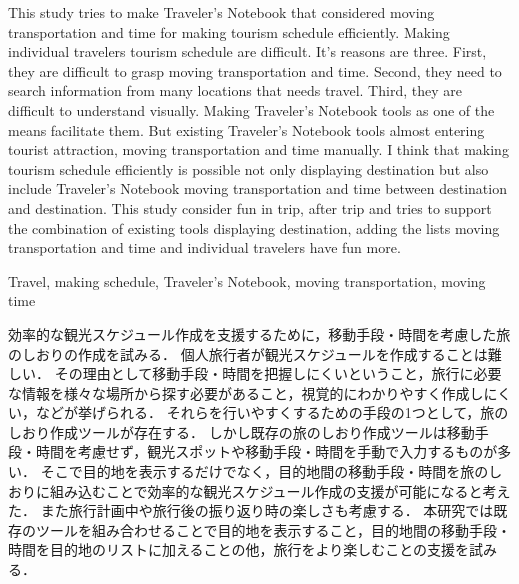 \documentclass{funthesis}
\begin{document}
\maketitle       %

\begin{eabstract}
This study tries to make Traveler's Notebook that considered moving transportation and time for making tourism schedule efficiently.
Making individual travelers tourism schedule are difficult.
It's reasons are three. First, they are difficult to grasp moving transportation and time. Second, they need to search information from many locations that needs travel. Third,  they are difficult to understand visually.
Making Traveler's Notebook tools as one of the means facilitate them.
But existing Traveler's Notebook tools almost entering tourist attraction, moving transportation and time manually.
I think that making tourism schedule efficiently is possible not only displaying destination but also include Traveler's Notebook moving transportation and time between destination and destination.
This study consider fun in trip, after trip 
and tries to support the combination of existing tools displaying destination, adding the lists moving transportation and time and individual travelers have fun more.

\end{eabstract}

\begin{ekeyword}
Travel, making schedule, Traveler's Notebook, moving transportation, moving time
\end{ekeyword}

\begin{jabstract}
効率的な観光スケジュール作成を支援するために，移動手段・時間を考慮した旅のしおりの作成を試みる．
個人旅行者が観光スケジュールを作成することは難しい．
その理由として移動手段・時間を把握しにくいということ，旅行に必要な情報を様々な場所から探す必要があること，視覚的にわかりやすく作成しにくい，などが挙げられる．
それらを行いやすくするための手段の1つとして，旅のしおり作成ツールが存在する．
しかし既存の旅のしおり作成ツールは移動手段・時間を考慮せず，観光スポットや移動手段・時間を手動で入力するものが多い．
そこで目的地を表示するだけでなく，目的地間の移動手段・時間を旅のしおりに組み込むことで効率的な観光スケジュール作成の支援が可能になると考えた．
また旅行計画中や旅行後の振り返り時の楽しさも考慮する．
本研究では既存のツールを組み合わせることで目的地を表示すること，目的地間の移動手段・時間を目的地のリストに加えることの他，旅行をより楽しむことの支援を試みる．

\end{jabstract}
\end{document}
